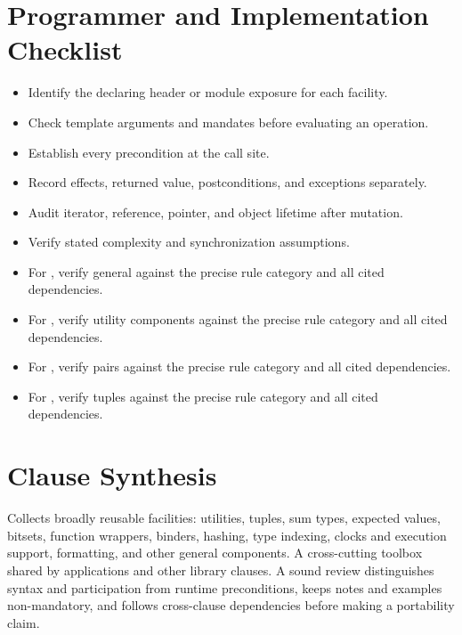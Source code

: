 \documentclass[11pt,letterpaper]{article}
\begin{document}
\section{Programmer and Implementation Checklist}
\begin{CornellReferenceChecklistBox}\begin{itemize}[label=$\square$]
\item Identify the declaring header or module exposure for each facility.
\item Check template arguments and mandates before evaluating an operation.
\item Establish every precondition at the call site.
\item Record effects, returned value, postconditions, and exceptions separately.
\item Audit iterator, reference, pointer, and object lifetime after mutation.
\item Verify stated complexity and synchronization assumptions.
\item For , verify general against the precise rule category and all cited dependencies.
\item For , verify utility components against the precise rule category and all cited dependencies.
\item For , verify pairs against the precise rule category and all cited dependencies.
\item For , verify tuples against the precise rule category and all cited dependencies.
\end{itemize}\end{CornellReferenceChecklistBox}
\section{Clause Synthesis}
\begin{CornellReferenceOrientationBox}Collects broadly reusable facilities: utilities, tuples, sum types, expected values, bitsets, function wrappers, binders, hashing, type indexing, clocks and execution support, formatting, and other general components. A cross-cutting toolbox shared by applications and other library clauses. A sound review distinguishes syntax and participation from runtime preconditions, keeps notes and examples non-mandatory, and follows cross-clause dependencies before making a portability claim.\end{CornellReferenceOrientationBox}
\end{document}

